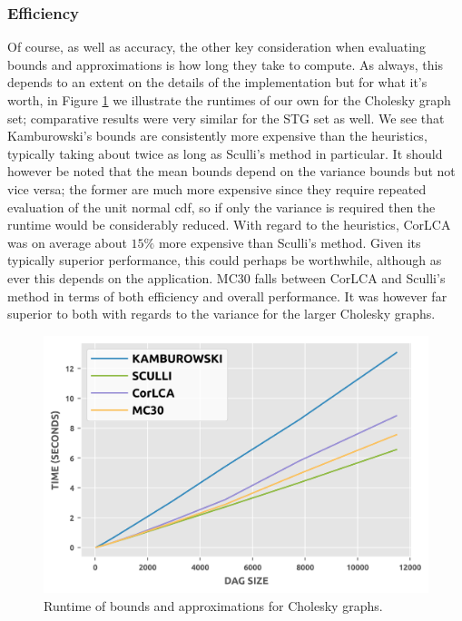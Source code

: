 \documentclass[12pt]{article}
\begin{document}
      \subsubsection{Efficiency}
\label{subsubsect.existing_efficiency}

      Of course, as well as accuracy, the other key consideration when evaluating bounds and approximations is how long they take to compute. As always, this depends to an extent on the details of the implementation but for what it's worth, in Figure \ref{plot.chol_existing_timings} we illustrate the runtimes of our own for the Cholesky graph set; comparative results were very similar for the STG set as well. We see that Kamburowski's bounds are consistently more expensive than the heuristics, typically taking about twice as long as Sculli's method in particular. It should however be noted that the mean bounds depend on the variance bounds but not vice versa; the former are much more expensive since they require repeated evaluation of the unit normal cdf, so if only the variance is required then the runtime would be considerably reduced. With regard to the heuristics, CorLCA was on average about $15\%$ more expensive than Sculli's method. Given its typically superior performance, this could perhaps be worthwhile, although as ever this depends on the application. MC30 falls between CorLCA and Sculli's method in terms of both efficiency and overall performance. It was however far superior to both with regards to the variance for the larger Cholesky graphs. 

      \begin{figure}
	\centering	
	\includegraphics[scale=1.0]{chol_existing_timings.png}
	\caption{Runtime of bounds and approximations for Cholesky graphs.}	
	\label{plot.chol_existing_timings}
      \end{figure} 
\end{document}
